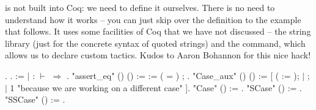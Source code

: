 \documentclass[12pt]{report}
\begin{document}
  is not built into Coq: we need to define it ourselves.
    There is no need to understand how it works -- you can just skip
    over the definition to the example that follows.  It uses some
    facilities of Coq that we have not discussed -- the string
    library (just for the concrete syntax of quoted strings) and the
     command, which allows us to declare custom tactics.  Kudos
    to Aaron Bohannon for this nice hack! \begin{coqdoccode}
\coqdocemptyline
\coqdocnoindent
{} .   .\coqdoceol
\coqdocemptyline
\coqdocnoindent
{}   :=\coqdoceol
\coqdocindent{1.00em}
   \coqdoceol
\coqdocindent{1.00em}
\ensuremath{|}  : \coqdocvar{\_} \ensuremath{\vdash} \coqdocvar{\_} \ensuremath{\Rightarrow}     \coqdoceol
\coqdocindent{1.00em}
.\coqdoceol
\coqdocemptyline
\coqdocnoindent
{} "assert\_eq" () () :=\coqdoceol
\coqdocindent{1.00em}
  :=  \coqdoceol
\coqdocindent{1.00em}
 ( = )    ;\coqdoceol
\coqdocindent{1.00em}
 .\coqdoceol
\coqdocemptyline
\coqdocnoindent
{} "Case\_aux" () () :=\coqdoceol
\coqdocindent{1.00em}
 [\coqdoceol
\coqdocindent{2.00em}
 ( := );  \coqdoceol
\coqdocindent{1.00em}
\ensuremath{|}   ;  \coqdoceol
\coqdocindent{1.00em}
\ensuremath{|}  1 "because we are working on a different case" ].\coqdoceol
\coqdocemptyline
\coqdocnoindent
{} "Case" () :=   .\coqdoceol
\coqdocnoindent
{} "SCase" () :=   .\coqdoceol
\coqdocnoindent
{} "SSCase" () :=   .\coqdoceol

\end{coqdoccode}
\end{document}
